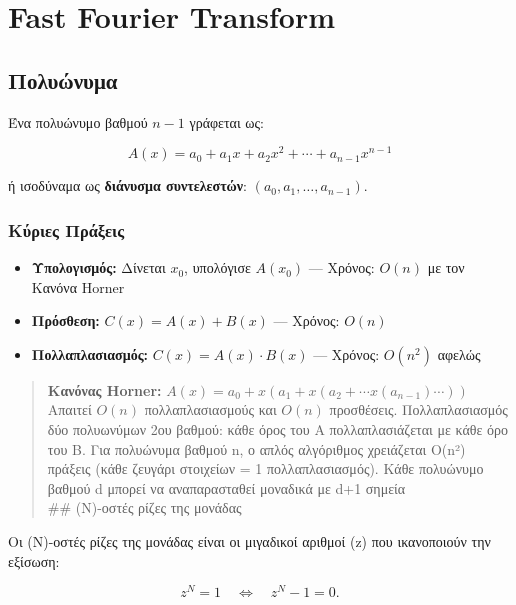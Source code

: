 \documentclass[a4paper, 11pt]{article}
\providecommand{\tightlist}{\setlength{\itemsep}{0pt}\setlength{\parskip}{0pt}}
\begin{document}
\section{Fast Fourier Transform}\label{fast-fourier-transform}

\subsection{Πολυώνυμα}\label{ux3c0ux3bfux3bbux3c5ux3ceux3bdux3c5ux3bcux3b1}

Ένα πολυώνυμο βαθμού \(n-1\) γράφεται ως:

\[A(x) = a_0 + a_1 x + a_2 x^2 + \cdots + a_{n-1} x^{n-1}\]

ή ισοδύναμα ως \textbf{διάνυσμα συντελεστών}:
\((a_0, a_1, \ldots, a_{n-1})\).

\subsubsection{Κύριες
Πράξεις}\label{ux3baux3cdux3c1ux3b9ux3b5ux3c2-ux3c0ux3c1ux3acux3beux3b5ux3b9ux3c2}

\begin{itemize}
\tightlist
\item
  \textbf{Υπολογισμός:} Δίνεται \(x_0\), υπολόγισε \(A(x_0)\) ---
  Χρόνος: \(O(n)\) με τον Κανόνα Horner
\item
  \textbf{Πρόσθεση:} \(C(x) = A(x) + B(x)\) --- Χρόνος: \(O(n)\)
\item
  \textbf{Πολλαπλασιασμός:} \(C(x) = A(x) \cdot B(x)\) --- Χρόνος:
  \(O(n^2)\) αφελώς
\end{itemize}

\begin{quote}
\textbf{Κανόνας Horner:}
\(A(x) = a_0 + x(a_1 + x(a_2 + \cdots x(a_{n-1})\cdots))\)\\
Απαιτεί \(O(n)\) πολλαπλασιασμούς και \(O(n)\) προσθέσεις.
Πολλαπλασιασμός δύο πολυωνύμων 2ου βαθμού: κάθε όρος του A
πολλαπλασιάζεται με κάθε όρο του B. Για πολυώνυμα βαθμού n, ο απλός
αλγόριθμος χρειάζεται O(n²) πράξεις (κάθε ζευγάρι στοιχείων = 1
πολλαπλασιασμός). Κάθε πολυώνυμο βαθμού d μπορεί να αναπαρασταθεί
μοναδικά με d+1 σημεία\\
\#\# (N)-οστές ρίζες της μονάδας
\end{quote}

Οι (N)-οστές ρίζες της μονάδας είναι οι μιγαδικοί αριθμοί (z) που
ικανοποιούν την εξίσωση:

\[
z^N = 1 \quad \Longleftrightarrow \quad z^N - 1 = 0.
\]
\end{document}
